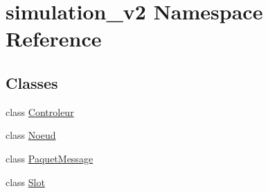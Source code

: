 \hypertarget{namespacesimulation__v2}{}\section{simulation\+\_\+v2 Namespace Reference}
\label{namespacesimulation__v2}
\subsection*{Classes}
\begin{DoxyCompactItemize}
\item 
class \hyperlink{classsimulation__v2_1_1Controleur}{Controleur}
\item 
class \hyperlink{classsimulation__v2_1_1Noeud}{Noeud}
\item 
class \hyperlink{classsimulation__v2_1_1PaquetMessage}{Paquet\+Message}
\item 
class \hyperlink{classsimulation__v2_1_1Slot}{Slot}
\end{DoxyCompactItemize}
